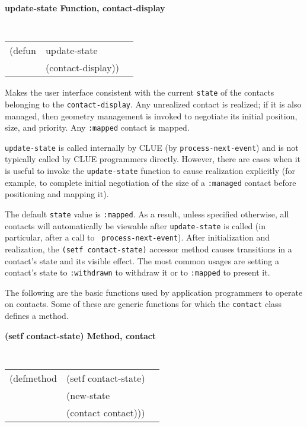 \documentclass[twoside]{book}
\begin{document}
\begin{sloppy}
{\samepage
{\large {\bf update-state \hfill Function, contact-display}} 
\begin{flushright} \parbox[t]{6.125in}{
\tt
\begin{tabular}{lll}
\raggedright
(defun & update-state & \\ 
& (contact-display))
\end{tabular}
\rm

}\end{flushright}}

\begin{flushright} \parbox[t]{6.125in}{
Makes the user interface consistent with the current {\tt state} of the contacts
belonging to the {\tt contact-display}. Any unrealized contact is realized; if
it is also managed, then geometry management is invoked to negotiate its initial
position, size, and priority. Any {\tt :mapped} contact is mapped.

{\tt update-state} is called internally by CLUE (by  {\tt process-next-event})
 and is not typically called by CLUE
programmers directly. However,
there are cases when it is useful to invoke the {\tt update-state} function to
cause
realization explicitly (for example, to complete initial negotiation of the size
of a {\tt :managed} contact before positioning and mapping it). 

}\end{flushright}

The default {\tt state} value is {\tt :mapped}. As a result, unless
specified otherwise, all contacts will automatically be viewable after 
{\tt update-state} is called (in particular, after a call to {\tt
process-next-event}). After initialization and realization, 
the {\tt (setf contact-state)} accessor method causes transitions in a contact's
state and its visible effect. The most common usages are setting a contact's
state to {\tt :withdrawn} to withdraw it or to {\tt :mapped} to present it.

The following are the basic functions  used by
application programmers to operate on contacts. Some of these are generic
functions for which the {\tt contact} class defines a method.

{\samepage
{\large {\bf (setf contact-state) \hfill Method, contact}}
\begin{flushright}
\parbox[t]{6.125in}{
\tt
\begin{tabular}{lll}
\raggedright
(defmethod & (setf contact-state) & \\
& (new-state \\
&  (contact  contact)))
\end{tabular}
\rm
}\end{flushright}}


\end{sloppy}
\end{document}
